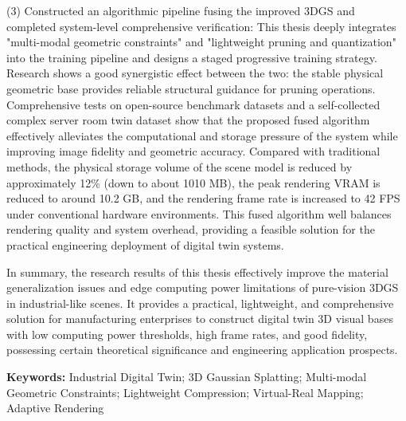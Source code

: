 (3) Constructed an algorithmic pipeline fusing the improved 3DGS and completed system-level comprehensive verification: This thesis deeply integrates "multi-modal geometric constraints" and "lightweight pruning and quantization" into the training pipeline and designs a staged progressive training strategy. Research shows a good synergistic effect between the two: the stable physical geometric base provides reliable structural guidance for pruning operations. Comprehensive tests on open-source benchmark datasets and a self-collected complex server room twin dataset show that the proposed fused algorithm effectively alleviates the computational and storage pressure of the system while improving image fidelity and geometric accuracy. Compared with traditional methods, the physical storage volume of the scene model is reduced by approximately 12\% (down to about 1010 MB), the peak rendering VRAM is reduced to around 10.2 GB, and the rendering frame rate is increased to 42 FPS under conventional hardware environments. This fused algorithm well balances rendering quality and system overhead, providing a feasible solution for the practical engineering deployment of digital twin systems.

In summary, the research results of this thesis effectively improve the material generalization issues and edge computing power limitations of pure-vision 3DGS in industrial-like scenes. It provides a practical, lightweight, and comprehensive solution for manufacturing enterprises to construct digital twin 3D visual bases with low computing power thresholds, high frame rates, and good fidelity, possessing certain theoretical significance and engineering application prospects.

\vspace{1em}
\noindent\textbf{Keywords:} Industrial Digital Twin; 3D Gaussian Splatting; Multi-modal Geometric Constraints; Lightweight Compression; Virtual-Real Mapping; Adaptive Rendering